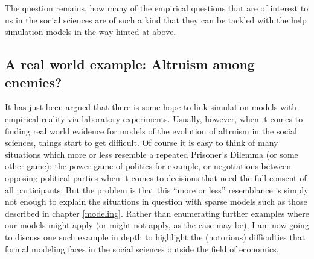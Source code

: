 The question remains, how many of the empirical questions that are of interest
to us in the social sciences are of such a kind that they can be tackled with
the help simulation models in the way hinted at above.

\subsection{A real world example: Altruism among enemies?}
\label{realWorldEvidence}

It has just been argued that there is some hope to link simulation models with
empirical reality via laboratory experiments. Usually, however, when it comes
to finding real world evidence for models of the evolution of altruism in the
social sciences, things start to get difficult. Of course it is easy to think
of many situations which more or less resemble a repeated Prisoner's Dilemma
(or some other game): the power game of politics for example, or negotiations
between opposing political parties when it comes to decisions that need the
full consent of all participants. But the problem is that this ``more or
less'' resemblance is simply not enough to explain the situations in question
with sparse models such as those described in chapter \ref{modeling}. Rather
than enumerating further examples where our models might apply (or might
not apply, as the case may be), I am now going to discuss one such example in
depth to highlight the (notorious) difficulties that formal modeling faces in
the social sciences outside the field of economics.

